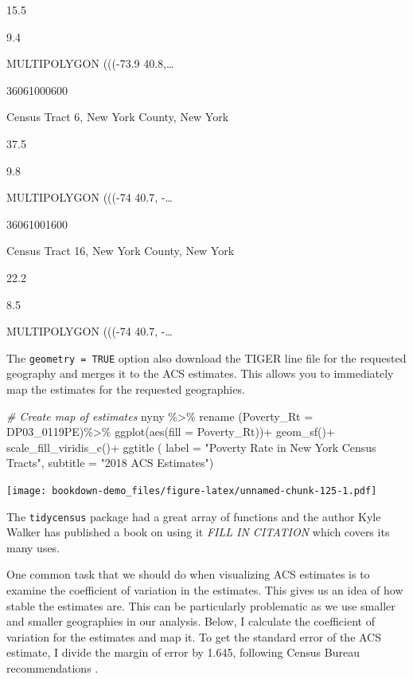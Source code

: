 \documentclass[
]{article}
\newenvironment{Shaded}{\begin{snugshade}}{\end{snugshade}}
\newcommand{\AttributeTok}[1]{\textcolor[rgb]{0.77,0.63,0.00}{#1}}
\newcommand{\CommentTok}[1]{\textcolor[rgb]{0.56,0.35,0.01}{\textit{#1}}}
\newcommand{\FunctionTok}[1]{\textcolor[rgb]{0.00,0.00,0.00}{#1}}
\newcommand{\NormalTok}[1]{#1}
\newcommand{\SpecialCharTok}[1]{\textcolor[rgb]{0.00,0.00,0.00}{#1}}
\newcommand{\StringTok}[1]{\textcolor[rgb]{0.31,0.60,0.02}{#1}}
\begin{document}
15.5

9.4

MULTIPOLYGON (((-73.9 40.8,\ldots{}

36061000600

Census Tract 6, New York County, New York

37.5

9.8

MULTIPOLYGON (((-74 40.7, -\ldots{}

36061001600

Census Tract 16, New York County, New York

22.2

8.5

MULTIPOLYGON (((-74 40.7, -\ldots{}

The \texttt{geometry\ =\ TRUE} option also download the TIGER line file for the requested geography and merges it to the ACS estimates. This allows you to immediately map the estimates for the requested geographies.

\begin{Shaded}
\begin{Highlighting}[]
\CommentTok{\# Create map of estimates}
\NormalTok{nyny }\SpecialCharTok{\%\textgreater{}\%} 
  \FunctionTok{rename}\NormalTok{ (}\AttributeTok{Poverty\_Rt =}\NormalTok{ DP03\_0119PE)}\SpecialCharTok{\%\textgreater{}\%}
  \FunctionTok{ggplot}\NormalTok{(}\FunctionTok{aes}\NormalTok{(}\AttributeTok{fill =}\NormalTok{ Poverty\_Rt))}\SpecialCharTok{+}
  \FunctionTok{geom\_sf}\NormalTok{()}\SpecialCharTok{+}
  \FunctionTok{scale\_fill\_viridis\_c}\NormalTok{()}\SpecialCharTok{+}
  \FunctionTok{ggtitle}\NormalTok{ ( }\AttributeTok{label =} \StringTok{"Poverty Rate in New York Census Tracts"}\NormalTok{, }
            \AttributeTok{subtitle =} \StringTok{"2018 ACS Estimates"}\NormalTok{)}
\end{Highlighting}
\end{Shaded}

\texttt{[image: bookdown-demo\_files/figure-latex/unnamed-chunk-125-1.pdf]}

The \texttt{tidycensus} package had a great array of functions and the author Kyle Walker has published a book on using it \emph{FILL IN CITATION} which covers its many uses.

One common task that we should do when visualizing ACS estimates is to examine the coefficient of variation in the estimates. This gives us an idea of how stable the estimates are. This can be particularly problematic as we use smaller and smaller geographies in our analysis. Below, I calculate the coefficient of variation for the estimates and map it. To get the standard error of the ACS estimate, I divide the margin of error by 1.645, following Census Bureau recommendations \citep{us_census_bureau_worked_nodate}.
\end{document}
